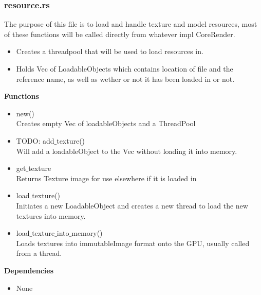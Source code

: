 \documentclass[12pt,a4paper]{article}
\begin{document}
\subsubsection{resource.rs}
The purpose of this file is to load and handle texture and model resources, most of these functions will be called directly from whatever impl CoreRender.\\
\begin{itemize}
\item Creates a threadpool that will be used to load resources in.
\item Holds Vec of LoadableObjects which contains location of file and the reference name, as well as wether or not it has been loaded in or not.
\end{itemize}
\textbf{Functions}
\begin{itemize}
\item new() \\Creates empty Vec of loadableObjects and a ThreadPool
\item TODO: add$\_$texture()\\Will add a loadableObject to the Vec without loading it into memory.
\item get$\_$texture\\Returns Texture image for use elsewhere if it is loaded in
\item load$\_$texture() \\Initiates a new LoadableObject and creates a new thread to load the new textures into memory.
\item load$\_$texture$\_$into$\_$memory() \\Loads textures into immutableImage format onto the GPU, usually called from a thread.
\end{itemize}
\textbf{Dependencies}
\begin{itemize}
\item None
\end{itemize}
\end{document}
